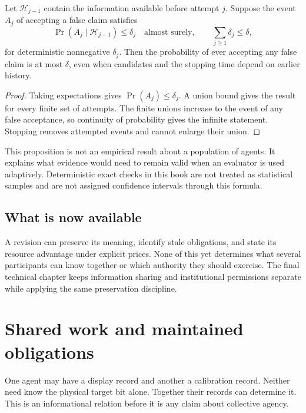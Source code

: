 \begin{proposition}\label{r:lineage}
Let $\mathcal H_{j-1}$ contain the information available before attempt $j$. Suppose the event $A_j$ of accepting a false claim satisfies
\[
\Pr(A_j\mid\mathcal H_{j-1})\le\delta_j\quad\text{almost surely},
\qquad\sum_{j\ge1}\delta_j\le\delta,
\]
for deterministic nonnegative $\delta_j$. Then the probability of ever accepting any false claim is at most $\delta$, even when candidates and the stopping time depend on earlier history.
\end{proposition}
\begin{proof}
Taking expectations gives $\Pr(A_j)\le\delta_j$. A union bound gives the result for every finite set of attempts. The finite unions increase to the event of any false acceptance, so continuity of probability gives the infinite statement. Stopping removes attempted events and cannot enlarge their union.
\end{proof}

This proposition is not an empirical result about a population of agents. It explains what evidence would need to remain valid when an evaluator is used adaptively. Deterministic exact checks in this book are not treated as statistical samples and are not assigned confidence intervals through this formula.

\section*{What is now available}
A revision can preserve its meaning, identify stale obligations, and state its resource advantage under explicit prices. None of this yet determines what several participants can know together or which authority they should exercise. The final technical chapter keeps information sharing and institutional permissions separate while applying the same preservation discipline.

\chapter{Shared work and maintained obligations}\label{ch:shared}
One agent may have a display record and another a calibration record. Neither need know the physical target bit alone. Together their records can determine it. This is an informational relation before it is any claim about collective agency.

